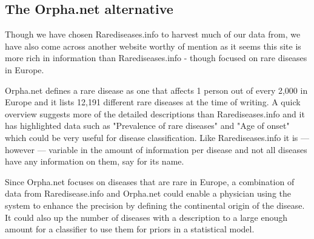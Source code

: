 \subsection{The Orpha.net alternative\label{Orphanet}}

Though we have chosen Rarediseases.info to harvest much of our data from, 
we have also come across another website worthy of mention as it seems 
this site is more rich in information than Rarediseases.info - though 
focused on rare diseases in Europe.

Orpha.net defines a rare disease as one that affects 1 person out of 
every 2,000 in Europe and it lists 12,191 different rare diseases at 
the time of writing. A quick overview suggests more of the detailed 
descriptions than Rarediseases.info and it has highlighted data such 
as "Prevalence of rare diseases" and "Age of onset" which could be very 
useful for disease classification. Like Rarediseases.info it is 
--- however --- variable in the amount of information per disease and 
not all diseases have any information on them, say for its name.

Since Orpha.net focuses on diseases that are rare in Europe, a combination 
of data from Raredisease.info and Orpha.net could enable a physician using 
the system to enhance the precision by defining the continental origin of 
the disease. It could also up the number of diseases with a description to 
a large enough amount for a classifier to use them for priors in a 
statistical model. 
